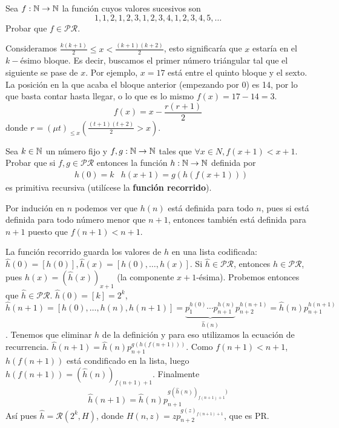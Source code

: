 \documentclass[twoside]{article}
\begin{document}
\newpage

\begin{ejercicio}{9}
Sea $f : \mathbb{N} \to \mathbb{N}$ la función cuyos valores sucesivos son
$$1, 1, 2, 1, 2, 3, 1, 2, 3, 4, 1, 2, 3, 4, 5, \dots$$
Probar que $f \in \mathcal{PR}$.
\end{ejercicio}
\begin{solucion}
Consideramos $\frac{k(k+1)}{2}\leq x < \frac{(k+1)(k+2)}{2}$, esto significaría que $x$ estaría en el $k-$ésimo bloque. Es decir, buscamos el primer número triángular tal que el siguiente se pase de $x$. Por ejemplo, $x=17$ está entre el quinto bloque y el sexto. La posición en la que acaba el bloque anterior (empezando por 0) es 14, por lo que basta contar hasta llegar, o lo que es lo mismo $f(x)=17-14=3$.
$$f(x)=x-\frac{r(r+1)}{2}$$
donde $r=(\mu t)_{\leq x}\left(\frac{(t+1)(t+2)}{2}>x\right)$. 
\end{solucion}

\newpage

\begin{ejercicio}{12}
Sea $k \in \mathbb{N}$ un número fijo y $f, g : \mathbb{N} \to \mathbb{N}$ tales que $\forall x \in N, f(x + 1) < x + 1$.
Probar que si $f, g \in \mathcal{PR}$ entonces la función $h : \mathbb{N} \to \mathbb{N}$ definida por
\begin{align*}
&h(0) = k
&h(x + 1) = g(h(f(x + 1)))
\end{align*}
es primitiva recursiva (utilícese la \textbf{función recorrido}).
\end{ejercicio}
\begin{solucion}
Por indución en $n$ podemos ver que $h(n)$ está definida para todo $n$, pues si está definida para todo número menor que $n+1$, entonces también está definida para $n+1$ puesto que $f(n+1)<n+1$. 

La función recorrido guarda los valores de $h$ en una lista codificada: $\hat{h}(0)=[h(0)],\hat{h}(x)=[h(0),\dots,h(x)]$. Si $\hat{h}\in\mathcal{PR}$, entonces $h\in\mathcal{PR}$, pues $h(x)=(\hat{h}(x))_{x+1}$ (la componente $x+1$-ésima). Probemos entonces que $\hat{h}\in\mathcal{PR}$. $\hat{h}(0)=[k]=2^k$, $\hat{h}(n+1)=[h(0),\dots,h(n),h(n+1)]=\underbrace{p_1^{h(0)}\cdots p_{n+1}^{h(n)}}_{\hat{h}(n)}p_{n+2}^{h(n+1)}=\hat{h}(n)p_{n+1}^{h(n+1)}$. Tenemos que eliminar $h$ de la definición y para eso utilizamos la ecuación de recurrencia. $\hat{h}(n+1)=\hat{h}(n)p_{n+1}^{g(h(f(n+1)))}$. Como $f(n+1)<n+1$, $h(f(n+1))$ está condificado en la lista, luego $h(f(n+1))=(\hat{h}(n))_{f(n+1)+1}$. Finalmente
$$\hat{h}(n+1)=\hat{h}(n)p_{n+1}^{g(\hat{h}(n))_{f(n+1)+1})}$$
Así pues $\hat{h}=\mathcal{R}(2^k, H)$, donde $H(n,z)=zp_{n+2}^{g(z)_{f(n+1)+1}}$, que es PR. 
\end{solucion}
\end{document}
